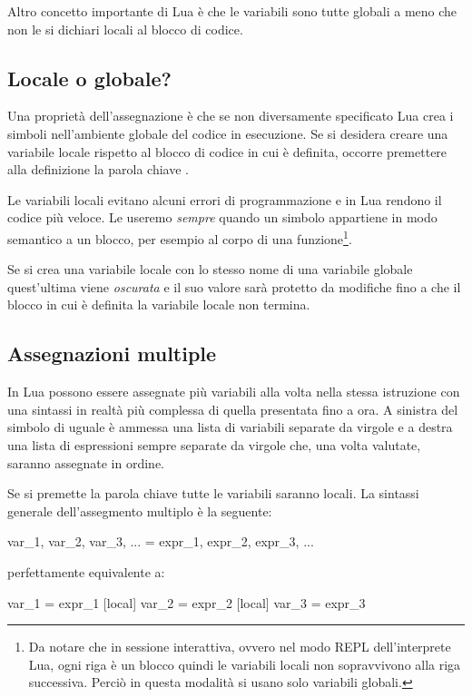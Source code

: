 Altro concetto importante di Lua è che le variabili sono tutte globali a meno
che non le si dichiari locali al blocco di codice.


\subsection{Locale o globale?}
\label{secFondLocaleGlobale}

Una proprietà dell'assegnazione è che se non diversamente specificato Lua
crea i simboli nell'ambiente globale del codice in esecuzione. Se si
desidera creare una variabile locale rispetto al blocco di codice in cui è
definita, occorre premettere alla definizione la parola chiave .

Le variabili locali evitano alcuni errori di programmazione e in Lua rendono il
codice più veloce. Le useremo \emph{sempre} quando un simbolo appartiene in modo
semantico a un blocco, per esempio al corpo di una funzione\footnote{Da notare
che in sessione interattiva, ovvero nel modo REPL dell'interprete Lua, ogni riga
è un blocco quindi le variabili locali non sopravvivono alla riga successiva.
Perciò in questa modalità si usano solo variabili globali.}.

Se si crea una variabile locale con lo stesso nome di una variabile globale
quest'ultima viene \emph{oscurata} e il suo valore sarà protetto da modifiche
fino a che il blocco in cui è definita la variabile locale non termina.


\subsection{Assegnazioni multiple}

In Lua possono essere assegnate più variabili alla volta nella stessa istruzione
con una sintassi in realtà più complessa di quella presentata fino a ora. A
sinistra del simbolo di uguale è ammessa una lista di variabili separate da
virgole e a destra una lista di espressioni sempre separate da virgole che, una
volta valutate, saranno assegnate in ordine.

Se si premette la parola chiave  tutte le variabili saranno locali.
La sintassi generale dell'assegmento multiplo è la seguente:
\begin{lines}
[local] var_1, var_2, var_3, ... = expr_1, expr_2, expr_3, ...
\end{lines}
perfettamente equivalente a:
\begin{lines}
[local] var_1 = expr_1
[local] var_2 = expr_2
[local] var_3 = expr_3
\end{lines}

